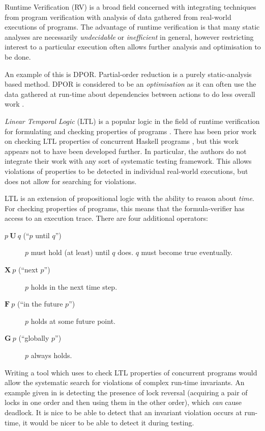 Runtime Verification (RV) is a broad field concerned with integrating
techniques from program verification with analysis of data gathered
from real-world executions of programs. The advantage of runtime
verification is that many static analyses are necessarily
\emph{undecidable} or \emph{inefficient} in general, however
restricting interest to a particular execution often allows further
analysis and optimisation to be done.

An example of this is DPOR. Partial-order reduction is a purely
static-analysis based method. DPOR is considered to be an
\emph{optimisation} as it can often use the data gathered at run-time
about dependencies between actions to do less overall work
\citep{dpor}.

\emph{Linear Temporal Logic} (LTL) is a popular logic in the field of
runtime verification for formulating and checking properties of
programs \citep{ltl}. There has been prior work on checking LTL
properties of concurrent Haskell programs \citep{hsrv}, but this work
appears not to have been developed further. In particular, the authors
do not integrate their work with any sort of systematic testing
framework. This allows violations of properties to be detected in
individual real-world executions, but does not allow for searching for
violations.

LTL is an extension of propositional logic with the ability to reason
about \emph{time}. For checking properties of programs, this means
that the formula-verifier has access to an execution trace. There are
four additional operators:

\begin{description}
\item[$p~\mathbf{U}~q$ (``$p$ until $q$'')] $p$ must hold (at least)
  until $q$ does. $q$ must become true eventually.

\item[$\mathbf{X}~p$ (``next $p$'')] $p$ holds in the next time step.

\item[$\mathbf{F}~p$ (``in the future $p$'')] $p$ holds at some future
  point.

\item[$\mathbf{G}~p$ (``globally $p$'')] $p$ always holds.
\end{description}

Writing a tool which uses \dejafu{} to check LTL properties of
concurrent programs would allow the systematic search for violations
of complex run-time invariants. An example given in \citep{hsrv} is
detecting the presence of lock reversal (acquiring a pair of locks in
one order and then using them in the other order), which \emph{can}
cause deadlock. It is nice to be able to detect that an invariant
violation occurs at run-time, it would be nicer to be able to detect
it during testing.

